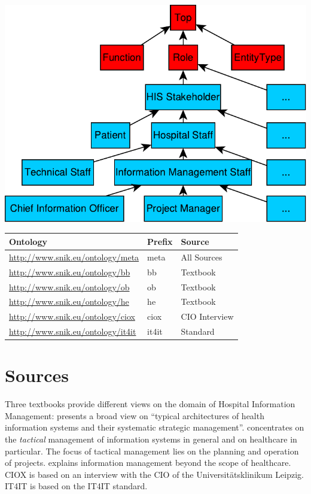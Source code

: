 \documentclass[sw]{iosart2x}
\renewcommand{\citet}{\cite}%
\renewcommand{\citep}{\cite}%
\begin{document}
\includegraphics[width=\columnwidth]{img/hierarchy.pdf}
\begin{center}
\begin{tabular*}{0.96\columnwidth}{lll}
\toprule
\textbf{Ontology}				&\textbf{Prefix}&\textbf{Source}\\
\midrule
\url{http://www.snik.eu/ontology/meta}		&meta		&All Sources\\
\url{http://www.snik.eu/ontology/bb}		&bb		&Textbook~\cite{bb}\\
\url{http://www.snik.eu/ontology/ob}		&ob		&Textbook~\cite{ob}\\
\url{http://www.snik.eu/ontology/he}		&he		&Textbook~\cite{he}\\
\url{http://www.snik.eu/ontology/ciox}		&ciox		&CIO Interview\\
\url{http://www.snik.eu/ontology/it4it}		&it4it		&Standard~\cite{it4it}\\
\bottomrule
\end{tabular*}
\end{center}

\section{Sources}\label{sec:sources}
Three textbooks provide different views on the domain of Hospital Information Management:
\citet{bb} presents a broad view on \enquote{typical architectures of health information systems and their systematic strategic management}.
\citep{ob} concentrates on the \emph{tactical} management of information systems in general and on healthcare in particular.
The focus of tactical management lies on the planning and operation of projects.  
\citet{he} explains information management beyond the scope of healthcare. 
CIOX is based on an interview with the CIO of the Universitätsklinikum Leipzig.
IT4IT is based on the IT4IT standard.
\end{document}
